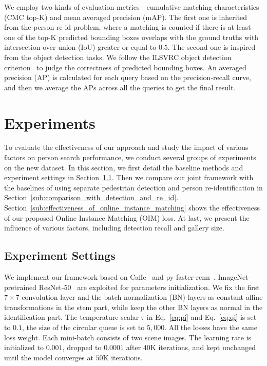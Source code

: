 \documentclass[10pt,twocolumn,letterpaper]{article}
\begin{document}
We employ two kinds of evaluation metrics---cumulative matching characteristics (CMC top-K) and mean averaged precision (mAP). The first one is inherited from the person re-id problem, where a matching is counted if there is at least one of the top-K predicted bounding boxes overlaps with the ground truths with intersection-over-union (IoU) greater or equal to $0.5$. The second one is inspired from the object detection tasks. We follow the ILSVRC object detection criterion~\cite{russakovsky2014imagenet} to judge the correctness of predicted bounding boxes. An averaged precision (AP) is calculated for each query based on the precision-recall curve, and then we average the APs across all the queries to get the final result.

\section{Experiments} %
\label{sec:experiments}
To evaluate the effectiveness of our approach and study the impact of various factors on person search performance, we conduct several groups of experiments on the new dataset. In this section, we first detail the baseline methods and experiment settings in Section~\ref{sub:experiment_settings}. Then we compare our joint framework with the baselines of using separate pedestrian detection and person re-identification in Section~\ref{sub:comparison_with_detection_and_re_id}. Section~\ref{sub:effectiveness_of_online_instance_matching} shows the effectiveness of our proposed Online Instance Matching (OIM) loss. At last, we present the influence of various factors, including detection recall and gallery size.

\subsection{Experiment Settings} %
\label{sub:experiment_settings}
We implement our framework based on Caffe~\cite{jia2014caffe,wang2016temporal} and py-faster-rcnn~\cite{girshick2015fast,ren2015faster}. ImageNet-pretrained ResNet-50~\cite{he2015deep} are exploited for parameters initialization. We fix the first $7\times 7$ convolution layer and the batch normalization (BN) layers as constant affine transformations in the stem part, while keep the other BN layers as normal in the identification part. The temperature scalar $\tau$ in Eq.~\eqref{eq:pi} and Eq.~\eqref{eq:qi} is set to $0.1$, the size of the circular queue is set to $5,000$. All the losses have the same loss weight. Each mini-batch consists of two scene images. The learning rate is initialized to $0.001$, dropped to $0.0001$ after $40$K iterations, and kept unchanged until the model converges at $50$K iterations.
\end{document}
